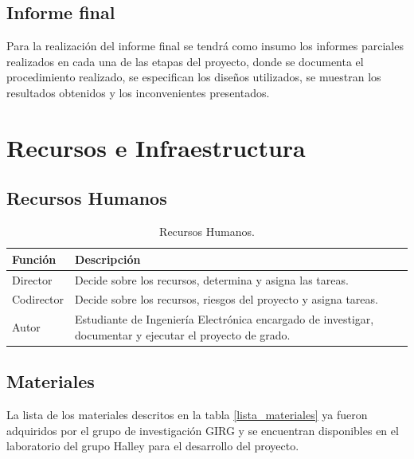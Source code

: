 \documentclass[11pt,letterpaper,oneside]{book}
\begin{document}
	 \section{\textbf{Informe final}}
Para la realización del informe final se tendrá como insumo los informes parciales realizados en cada una de las etapas del proyecto, donde se documenta el procedimiento realizado, se especifican los diseños utilizados, se muestran los resultados obtenidos y los inconvenientes presentados.   
\newpage 
\chapter{Recursos e Infraestructura}
\section{\textbf{Recursos Humanos}}

\begin{table}[htbp]
\begin{center}
\begin{tabular}{|p{2cm}|p{7cm}|}\hline
Función & Descripción \\
\hline    \hline
Director  & Decide sobre los recursos, determina y asigna las tareas. \\ \hline
Codirector  & Decide sobre los recursos, riesgos del proyecto y asigna tareas.  \\ \hline
Autor  & Estudiante de Ingeniería Electrónica encargado de investigar, documentar y ejecutar el proyecto de grado.  \\ \hline
\end{tabular}
\caption{Recursos Humanos.}
\label{Tabla: Recursos Humanos}
\end{center}
\end{table}
 
\section{\textbf{Materiales}}
La lista de los materiales descritos en la tabla \ref{lista_materiales} ya fueron adquiridos por el grupo de investigación GIRG y se encuentran disponibles en el laboratorio del grupo Halley para el desarrollo del proyecto. \\
\end{document}
